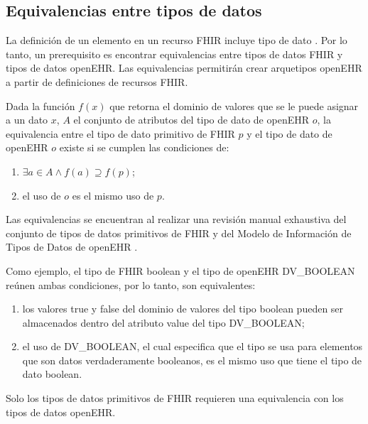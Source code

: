 \subsection{Equivalencias entre tipos de datos}

La definición de un elemento en un recurso FHIR incluye tipo de dato \cite{FHIRElement}. Por lo tanto, un prerequisito es encontrar equivalencias entre tipos de datos FHIR y tipos de datos openEHR. Las equivalencias permitirán crear arquetipos openEHR a partir de definiciones de recursos FHIR.

Dada la función \( f(x) \) que retorna el dominio de valores que se le puede asignar a un dato \( x \), \( A \) el conjunto de atributos del tipo de dato de openEHR \( o \), la equivalencia entre el tipo de dato primitivo de FHIR \( p \)  y el tipo de dato de openEHR \( o \) existe si se cumplen las condiciones de:

\begin{enumerate}
  \item \( \exists a \in A \land f(a) \supseteq f(p) \);
  \item el uso de \( o \) es el mismo uso de \( p \).
\end{enumerate}

Las equivalencias se encuentran al realizar una revisión manual exhaustiva del conjunto de tipos de datos primitivos de FHIR \cite{FHIRDataTypes} y del Modelo de Información de Tipos de Datos de openEHR \cite{openEHRDataTypes}.

Como ejemplo, el tipo de FHIR boolean y el tipo de openEHR DV\_BOOLEAN reúnen ambas condiciones, por lo tanto, son equivalentes:
\begin{enumerate}
  \item los valores true y false del dominio de valores del tipo boolean pueden ser almacenados dentro del atributo value del tipo DV\_BOOLEAN;
  \item el uso de DV\_BOOLEAN, el cual especifica que el tipo se usa para elementos que son datos verdaderamente booleanos, es el mismo uso que tiene el tipo de dato boolean.
\end{enumerate}

Solo los tipos de datos primitivos de FHIR requieren una equivalencia con los tipos de datos openEHR.
